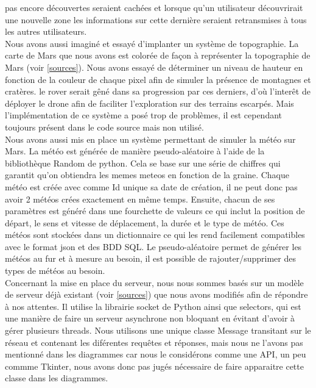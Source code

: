 \documentclass[12pt,a4paper]{scrartcl}
\begin{document}
pas encore découvertes seraient cachées et lorsque qu'un utilisateur découvrirait une nouvelle zone les informations sur cette dernière
seraient retransmises à tous les autres utilisateurs.\\
Nous avons aussi imaginé et essayé d'implanter un système de topographie. La carte de Mars que nous avons est colorée de façon
à représenter la topographie de Mars (voir \ref{sources}). Nous avons essayé de déterminer un niveau de hauteur en fonction de la couleur de chaque pixel
afin de simuler la présence de montagnes et cratères. le rover serait gêné dans sa progression par ces derniers, d'où l'interêt de déployer
le drone afin de faciliter l'exploration sur des terrains escarpés. Mais l'implémentation de ce système a posé trop de problèmes, il est cependant
toujours présent dans le code source mais non utilisé.\\
Nous avons aussi mis en place un système permettant de simuler la météo sur Mars. La météo est générée de manière pseudo-aléatoire à l'aide de la bibliothèque Random de python.
Cela se base sur une série de chiffres qui garantit qu'on obtiendra les memes meteos en fonction de la graine.
Chaque météo est créée avec comme Id unique sa date de création, il ne peut donc pas avoir 2 météos crées exactement en même temps.
Ensuite, chacun de ses paramètres est généré dans une fourchette de valeurs ce qui inclut la position de départ, le sens et vitesse de déplacement, la durée et le type de météo.
Ces météos sont stockées dans un dictionnaire ce qui les rend facilement compatibles avec le format json et des BDD SQL.
Le pseudo-aléatoire permet de générer les météos au fur et à mesure au besoin, il est possible de rajouter/supprimer des types de météos au besoin.
\\
Concernant la mise en place du serveur, nous nous sommes basés sur un modèle de serveur déjà existant (voir \ref{sources})
que nous avons modifiés afin de répondre à nos attentes. Il utilise la librairie socket de Python ainsi que selectors, qui est
une manière de faire un serveur asynchrone non bloquant en évitant d'avoir à gérer plusieurs threads.
Nous utilisons une unique classe Message transitant sur le réseau et contenant les diférentes requêtes et réponses, mais nous
ne l'avons pas mentionné dans les diagrammes car nous le considérons comme une API, un peu commme Tkinter, nous avons donc pas jugés
nécessaire de faire apparaitre cette classe dans les diagrammes.
\end{document}
